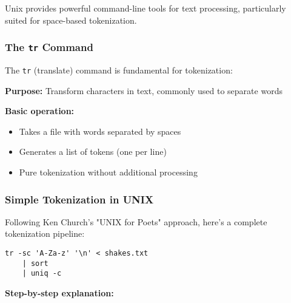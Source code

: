 \documentclass[11pt,a4paper]{article}
\theoremstyle{definition}
\theoremstyle{plain}
\theoremstyle{remark}
\begin{document}
Unix provides powerful command-line tools for text processing, particularly suited for space-based tokenization.

\subsubsection{The \texttt{tr} Command}

The \texttt{tr} (translate) command is fundamental for tokenization:

\textbf{Purpose:} Transform characters in text, commonly used to separate words

\textbf{Basic operation:}
\begin{itemize}
    \item Takes a file with words separated by spaces
    \item Generates a list of tokens (one per line)
    \item Pure tokenization without additional processing
\end{itemize}

\subsubsection{Simple Tokenization in UNIX}

Following Ken Church's "UNIX for Poets" approach, here's a complete tokenization pipeline:

\begin{verbatim}
tr -sc 'A-Za-z' '\n' < shakes.txt
    | sort
    | uniq -c
\end{verbatim}

\textbf{Step-by-step explanation:}
\end{document}
